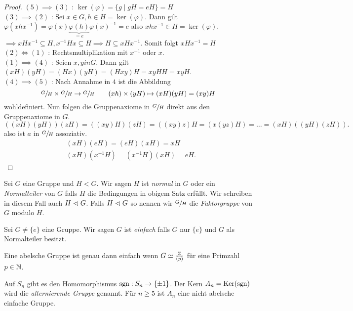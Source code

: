 \begin{proof}
	$(5) \implies (3)$ : $\ker(\varphi) = \{g \mid gH = e H\} = H$ \\
	$(3) \implies (2)$ : Sei $x \in G, h \in H = \ker(\varphi)$.
	Dann gilt $\varphi(x h x^{-1}) = \varphi(x) \underbrace{\varphi(h)}_{= e} \varphi(x)^{-1} = e$ also $x h x^{-1} \in H = \ker(\varphi)$.
	$\implies x H x^{-1} \subseteq H, x^{-1} H x \subseteq H \implies H \subseteq x H x^{-1}$. Somit folgt $x H x^{-1} = H$\\
	$(2) \Leftrightarrow (1)$ : Rechtsmultiplikation mit $x^{-1}$ oder $x$.\\
	$(1) \implies (4)$ : Seien $x,y in G$. Dann gilt $(xH)(yH) = (Hx)(yH) = (Hxy)H = xy H H = xy H$.\\
	$(4) \implies (5)$ : Nach Annahme in $4$ ist die Abbildung 
	\[
		\sfrac{G}{H} \times \sfrac{G}{H} \to \sfrac{G}{H} \qquad (xh) \times (yH) \mapsto (xH)(yH) = (xy) H
	\]
	wohldefiniert. Nun folgen die Gruppenaxiome in $\sfrac{G}{H}$ direkt aus den Gruppenaxiome in $G$.
	\[
		((xH)(yH)) (zH) = ((xy)H)(zH) = ((xy) z) H = (x(yz)H) = \ldots = (xH)((yH)(zH))
	.\] 
	also ist $a$ in $\sfrac{G}{H}$ assoziativ.
	\begin{align*}
		&(xH)(eH) = (eH)(xH) = xH\\
		&(xH)(x^{-1} H) = (x^{-1} H)(xH) = e H
	.\end{align*}
\end{proof}

\begin{definition}
	Sei $G$ eine Gruppe und $H < G$.
	Wir sagen $H$ ist \emph{normal} in $G$ oder ein \emph{Normalteiler} von $G$ falls $H$ die Bedingungen in obigem Satz erfüllt.
	Wir schreiben in diesem Fall auch $H \vartriangleleft G$.
	Falls $H \vartriangleleft G$ so nennen wir $\sfrac{G}{H}$ die \emph{Faktorgruppe} von $G$ modulo $H$.
\end{definition}

\begin{definition}
	Sei $G \neq \{e\} $ eine Gruppe. Wir sagen $ G$ ist \emph{einfach} falls $G$ nur $\{e\} $ und $G$ als Normalteiler besitzt.
\end{definition}

\begin{eg}
	Eine abelsche Gruppe ist genau dann einfach wenn $G \simeq \frac{\mathbb{Z}}{(p)}$ für eine Primzahl $p \in \mathbb{N}$.
\end{eg}

\begin{eg}
	Auf $S_{n}$ gibt es den Homomorphismus $\operatorname{sgn}: S_{n} \to \{\pm 1\} $. Der Kern $A_{n} = \operatorname{Ker}(\operatorname{sgn})$ wird die \emph{alternierende Gruppe} genannt.
	Für $n \geq 5$ ist $A_{n}$ eine nicht abelsche einfache Gruppe.
\end{eg}

